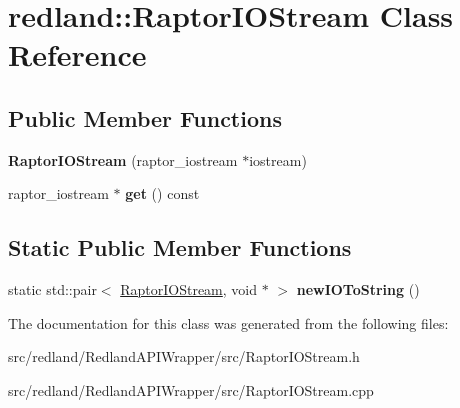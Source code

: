 \hypertarget{classredland_1_1RaptorIOStream}{}\section{redland\+:\+:Raptor\+I\+O\+Stream Class Reference}
\label{classredland_1_1RaptorIOStream}
\subsection*{Public Member Functions}
\begin{DoxyCompactItemize}
\item 
\mbox{\label{classredland_1_1RaptorIOStream_a6cf2e1a9cf6c31bb37069c5b3e591509}} 
{\bfseries Raptor\+I\+O\+Stream} (raptor\+\_\+iostream $\ast$iostream)
\item 
\mbox{\label{classredland_1_1RaptorIOStream_adbcfcc29e030219dfd180ecb3d6c2c4b}} 
raptor\+\_\+iostream $\ast$ {\bfseries get} () const
\end{DoxyCompactItemize}
\subsection*{Static Public Member Functions}
\begin{DoxyCompactItemize}
\item 
\mbox{\label{classredland_1_1RaptorIOStream_ab4b78aede5b54be5a654c9b81e65452c}} 
static std\+::pair$<$ \hyperlink{classredland_1_1RaptorIOStream}{Raptor\+I\+O\+Stream}, void $\ast$ $>$ {\bfseries new\+I\+O\+To\+String} ()
\end{DoxyCompactItemize}


The documentation for this class was generated from the following files\+:\begin{DoxyCompactItemize}
\item 
src/redland/\+Redland\+A\+P\+I\+Wrapper/src/Raptor\+I\+O\+Stream.\+h\item 
src/redland/\+Redland\+A\+P\+I\+Wrapper/src/Raptor\+I\+O\+Stream.\+cpp\end{DoxyCompactItemize}
